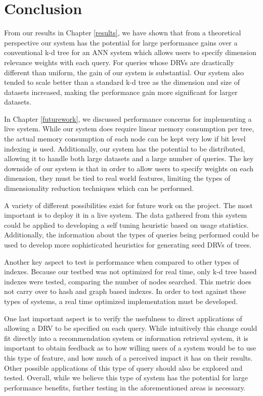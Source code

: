 \chapter{Conclusion} %

\label{conclusion} %


From our results in Chapter \ref{results}, we have shown that from a theoretical perspective our system has the potential for large performance gains over a conventional k-d tree for an ANN system which allows users to specify dimension relevance weights with each query.  For queries whose DRVs are drastically different than uniform, the gain of our system is substantial.  Our system also tended to scale better than a standard k-d tree as the dimension and size of datasets increased, making the performance gain more significant for larger datasets.

In Chapter \ref{futurework}, we discussed performance concerns for implementing a live system.  While our system does require linear memory consumption per tree, the actual memory consumption of each node can be kept very low if bit level indexing is used.  Additionally, our system has the potential to be distributed, allowing it to handle both large datasets and a large number of queries.  The key downside of our system is that in order to allow users to specify weights on each dimension, they must be tied to real world features, limiting the types of dimensionality reduction techniques which can be performed.

A variety of different possibilities exist for future work on the project.  The most important is to deploy it in a live system.  The data gathered from this system could be applied to developing a self tuning heuristic based on usage statistics.  Additionally, the information about the types of queries being performed could be used to develop more sophisticated heuristics for generating seed DRVs of trees.

Another key aspect to test is performance when compared to other types of indexes.  Because our testbed was not optimized for real time, only k-d tree based indexes were tested, comparing the number of nodes searched.  This metric does not carry over to hash and graph based indexes.  In order to test against these types of systems, a real time optimized implementation must be developed.

One last important aspect is to verify the usefulness to direct applications of allowing a DRV to be specified on each query.  While intuitively this change could fit directly into a recommendation system or information retrieval system, it is important to obtain feedback as to how willing users of a system would be to use this type of feature, and  how much of a perceived impact it has on their results.  Other possible applications of this type of query should also be explored and tested.  Overall, while we believe this type of system has the potential for large performance benefits, further testing in the aforementioned areas is necessary.